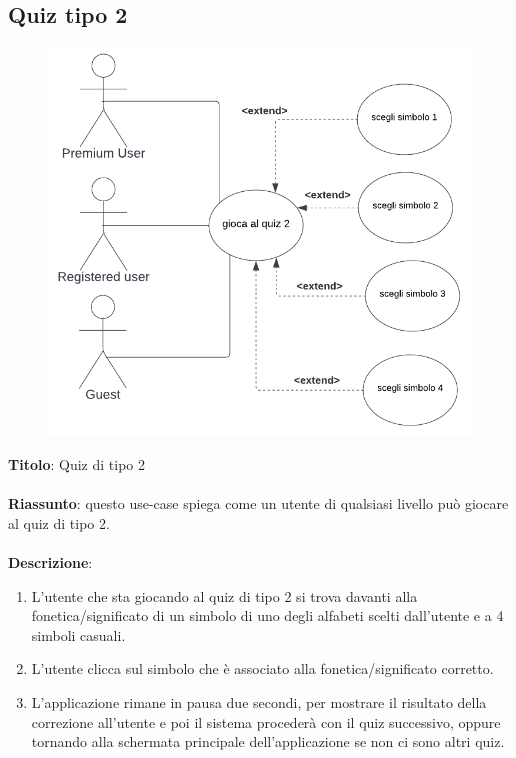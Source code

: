 \newpage
\subsection{Quiz tipo 2} \label{req_quiz_2}
\begin{figure}[!h]
\centering
\includegraphics[scale=0.35]{images/use_case_quiz_2.png}
\end{figure}
\noindent
\textbf{Titolo}: Quiz di tipo 2\\
\\
\textbf{Riassunto}: questo use-case spiega come un utente di qualsiasi livello può giocare al quiz di tipo 2.\\
\\
\textbf{Descrizione}:
\begin{enumerate}
    \item L'utente che sta giocando al quiz di tipo 2 si trova davanti alla fonetica/significato di un simbolo di uno degli alfabeti scelti dall'utente e a 4 simboli casuali.
    \item L'utente clicca sul simbolo che è associato alla fonetica/significato corretto.
    \item L'applicazione rimane in pausa due secondi, per mostrare il risultato della correzione all'utente e poi il sistema procederà con il quiz successivo, oppure tornando alla schermata principale dell'applicazione se non ci sono altri quiz.
\end{enumerate}

